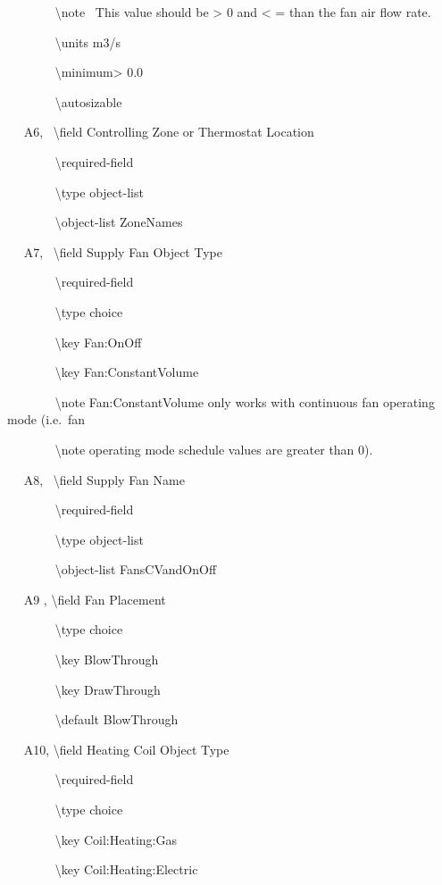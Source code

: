 ~~~~~~~ \textbackslash{}note~ This value should be \textgreater{} 0 and \textless{} = than the fan air flow rate.

~~~~~~~ \textbackslash{}units m3/s

~~~~~~~ \textbackslash{}minimum\textgreater{} 0.0

~~~~~~~ \textbackslash{}autosizable

~~ A6,~ \textbackslash{}field Controlling Zone or Thermostat Location

~~~~~~~ \textbackslash{}required-field

~~~~~~~ \textbackslash{}type object-list

~~~~~~~ \textbackslash{}object-list ZoneNames

~~ A7,~ \textbackslash{}field Supply Fan Object Type

~~~~~~~ \textbackslash{}required-field

~~~~~~~ \textbackslash{}type choice

~~~~~~~ \textbackslash{}key Fan:OnOff

~~~~~~~ \textbackslash{}key Fan:ConstantVolume

~~~~~~~ \textbackslash{}note Fan:ConstantVolume only works with continuous fan operating mode (i.e.~fan

~~~~~~~ \textbackslash{}note operating mode schedule values are greater than 0).

~~ A8,~ \textbackslash{}field Supply Fan Name

~~~~~~~ \textbackslash{}required-field

~~~~~~~ \textbackslash{}type object-list

~~~~~~~ \textbackslash{}object-list FansCVandOnOff

~~ A9 , \textbackslash{}field Fan Placement

~~~~~~~ \textbackslash{}type choice

~~~~~~~ \textbackslash{}key BlowThrough

~~~~~~~ \textbackslash{}key DrawThrough

~~~~~~~ \textbackslash{}default BlowThrough

~~ A10, \textbackslash{}field Heating Coil Object Type

~~~~~~~ \textbackslash{}required-field

~~~~~~~ \textbackslash{}type choice

~~~~~~~ \textbackslash{}key Coil:Heating:Gas

~~~~~~~ \textbackslash{}key Coil:Heating:Electric

